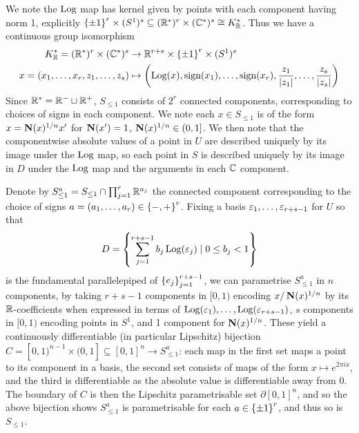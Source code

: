 \documentclass[11pt]{report}
\begin{document}
We note the $\operatorname{Log}$ map has kernel given by points with each component having norm 1, explicitly $\left\{  \pm 1  \right\}^r \times (S^1)^s \subseteq (\mathbb{R}^*)^r \times (\mathbb{C}^*)^s \cong K_{\mathbb{R}}^*$. Thus we have a continuous group isomorphism
\begin{align}
    K_{\mathbb{R}}^* = (\mathbb{R}^*)^r \times (\mathbb{C}^*)^s &\to \mathbb{R}^{r + s} \times \left\{  \pm 1  \right\}^r \times (S^1)^s \nonumber \\
    x = (x_1, \ldots, x_r, z_1, \ldots, z_s) &\mapsto \left(  \operatorname{Log}(x), \operatorname{sign}(x_1), \ldots, \operatorname{sign}(x_r), \frac{z_1}{\left| z_1 \right|}, \ldots, \frac{z_s}{\left| z_s \right|}  \right)\label{contgpiso}
\end{align}
Since $\mathbb{R}^* = \mathbb{R}^- \sqcup \mathbb{R}^+$, $S_{\leq 1}$ consists of $2^r$ connected components, corresponding to choices of signs in each component. We note each $x \in S_{\leq 1}$ is of the form $x = \operatorname{\mathbf{N}}(x)^{1/n}x'$ for $\operatorname{\mathbf{N}}(x') = 1$, $\operatorname{\mathbf{N}}(x)^{1/n} \in (0, 1]$. We then note that the componentwise absolute values of a point in $U$ are described uniquely by its image under the $\operatorname{Log}$ map, so each point in $S$ is described uniquely by its image in $D$ under the $\operatorname{Log}$ map and the arguments in each $\mathbb{C}$ component. 

Denote by $S_{\leq 1}^a = S_{\leq 1} \cap \prod_{j = 1}^r\mathbb{R}^{a_j}$ the connected component corresponding to the choice of signs $a = (a_1, \ldots, a_r) \in \left\{  -, +  \right\}^r$. Fixing a basis $\varepsilon_1, \ldots, \varepsilon_{r + s - 1}$ for $U$ so that 
$$
    D = \left\{  \sum_{j = 1}^{r + s - 1} b_j\operatorname{Log}(\varepsilon_j) \mid 0 \leq b_j < 1  \right\}
$$
is the fundamental parallelepiped of $\left\{  e_j  \right\}_{j = 1}^{r + s - 1}$, we can parametrise $S_{\leq 1}^a$ in $n$ components, by taking $r + s - 1$ components in $[0, 1)$ encoding $x/\operatorname{\mathbf{N}}(x)^{1/n}$ by its $\mathbb{R}$-coefficients when expressed in terms of $\operatorname{Log}(\varepsilon_1), \ldots, \operatorname{Log}(\varepsilon_{r + s - 1})$, $s$ components in $[0, 1)$ encoding points in $S^1$, and 1 component for $\operatorname{\mathbf{N}}(x)^{1/n}$. These yield a continuously differentiable (in particular Lipschitz) bijection $C = [0, 1)^{n - 1} \times (0, 1] \subseteq [0, 1]^n \to S_{\leq 1}^a$: each map in the first set maps a point to its component in a basis, the second set consists of maps of the form $x \mapsto e^{2\pi i x}$, and the third is differentiable as the absolute value is differentiable away from $0$. The boundary of $C$ is then the Lipschitz parametrisable set $\partial [0, 1]^n$, and so the above bijection shows $S_{\leq 1}^a$ is parametrisable for each $a \in \left\{  \pm 1  \right\}^r$, and thus so is $S_{\leq 1}$.
\end{document}
